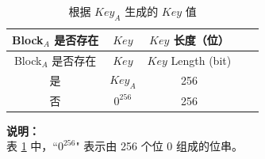 \begin{longtable}[c]{ |c|c|c|c|c| }
\caption{根据 \begin{math}Key_{A}\end{math} 生成的 \begin{math}Key\end{math} 值}
\label{tab:extmemencr-key-possibility}
\\\hline 
\rowcolor{lightgray}
Block$_A$ 是否存在& \begin{math}Key\end{math}  & \begin{math}Key\end{math} 长度（位） \\\hline
\endfirsthead
\hline
\rowcolor{lightgray}
Block$_A$ 是否存在& \begin{math}Key\end{math}  & \begin{math}Key\end{math} Length (bit) \\\hline
\endhead
\endfoot
是       &   \begin{math}           Key_{A}\end{math}    &   256   \\\hline
否        &   \begin{math}           0^{256}\end{math}    &   256   \\\hline
\end{longtable}
\vspace{-1.5em}
{\bfseries 说明：}\\
表 \ref{tab:extmemencr-key-possibility} 中，``\begin{math}0^{256}\end{math}" 表示由 256 个位 0 组成的位串。

